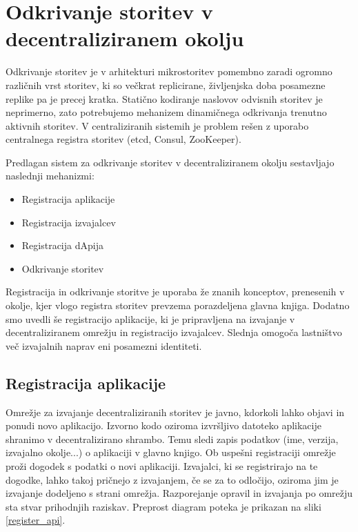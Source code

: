 \documentclass[a4paper, 12pt]{book}
\begin{document}
\section{Odkrivanje storitev v decentraliziranem okolju}

Odkrivanje storitev je v arhitekturi mikrostoritev pomembno zaradi ogromno različnih vrst storitev, ki so večkrat replicirane, življenjska doba posamezne replike pa je precej kratka.
Statično kodiranje naslovov odvisnih storitev je neprimerno, zato potrebujemo mehanizem dinamičnega odkrivanja trenutno aktivnih storitev.
V centraliziranih sistemih je problem rešen z uporabo centralnega registra storitev (etcd, Consul, ZooKeeper).

Predlagan sistem za odkrivanje storitev v decentraliziranem okolju sestavljajo naslednji mehanizmi:
\begin{itemize}
	\item Registracija aplikacije
	\item Registracija izvajalcev
	\item Registracija dApija
	\item Odkrivanje storitev
\end{itemize}

Registracija in odkrivanje storitve je uporaba že znanih konceptov, prenesenih v okolje, kjer vlogo registra storitev prevzema porazdeljena glavna knjiga.
Dodatno smo uvedli še registracijo aplikacije, ki je pripravljena na izvajanje v decentraliziranem omrežju in registracijo izvajalcev.
Slednja omogoča lastništvo več izvajalnih naprav eni posamezni identiteti.


\subsection{Registracija aplikacije}
\label{registerService}

Omrežje za izvajanje decentraliziranih storitev je javno, kdorkoli lahko objavi in ponudi novo aplikacijo.
Izvorno kodo oziroma izvršljivo datoteko aplikacije shranimo v decentralizirano shrambo.
Temu sledi zapis podatkov (ime, verzija, izvajalno okolje...) o aplikaciji v glavno knjigo.
Ob uspešni registraciji omrežje proži dogodek s podatki o novi aplikaciji.
Izvajalci, ki se registrirajo na te dogodke, lahko takoj pričnejo z izvajanjem, če se za to odločijo, oziroma jim je izvajanje dodeljeno s strani omrežja.
Razporejanje opravil in izvajanja po omrežju sta stvar prihodnjih raziskav.
Preprost diagram poteka je prikazan na sliki \ref{register_api}.
\end{document}
